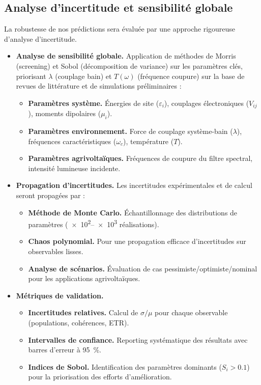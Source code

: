 \documentclass[12pt, a4paper]{article}
\begin{document}
\subsection{Analyse d'incertitude et sensibilité globale}

La robustesse de nos prédictions sera évaluée par une approche rigoureuse d'analyse d'incertitude.

\begin{itemize}
    \item \textbf{Analyse de sensibilité globale.} Application de méthodes de Morris (screening) et Sobol (décomposition de variance) sur les paramètres clés, priorisant $\lambda$ (couplage bain) et $T(\omega)$ (fréquence coupure) sur la base de revues de littérature et de simulations préliminaires :
    \begin{itemize}
        \item \textbf{Paramètres système.} Énergies de site ($\varepsilon_i$), couplages électroniques ($V_{ij}$), moments dipolaires ($\mu_i$).
        \item \textbf{Paramètres environnement.} Force de couplage système-bain ($\lambda$), fréquences caractéristiques ($\omega_c$), température ($T$).
        \item \textbf{Paramètres agrivoltaïques.} Fréquences de coupure du filtre spectral, intensité lumineuse incidente.
\end{itemize}
    
    \item \textbf{Propagation d'incertitudes.} Les incertitudes expérimentales et de calcul seront propagées par :
    \begin{itemize}
        \item \textbf{Méthode de Monte Carlo.} Échantillonnage des distributions de paramètres (\numrange{e2}{e3} réalisations).
        \item \textbf{Chaos polynomial.} Pour une propagation efficace d'incertitudes sur observables lisses.
        \item \textbf{Analyse de scénarios.} Évaluation de cas pessimiste/optimiste/nominal pour les applications agrivoltaïques.
\end{itemize}
    
    \item \textbf{Métriques de validation.}
    \begin{itemize}
        \item \textbf{Incertitudes relatives.} Calcul de $\sigma/\mu$ pour chaque observable (populations, cohérences, ETR).
        \item \textbf{Intervalles de confiance.} Reporting systématique des résultats avec barres d'erreur à \SI{95}{\percent}.
        \item \textbf{Indices de Sobol.} Identification des paramètres dominants ($S_i > 0.1$) pour la priorisation des efforts d'amélioration.
\end{itemize}
\end{itemize}
\end{document}
